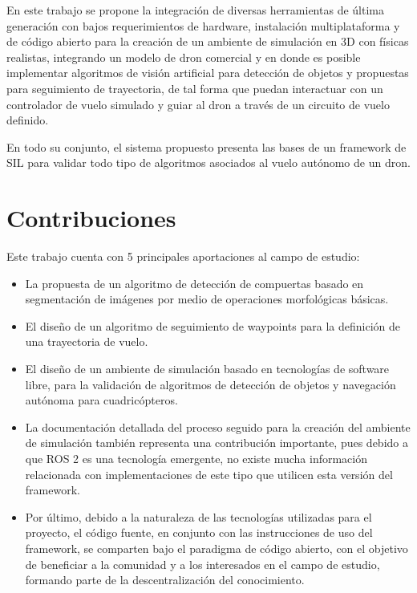 En este trabajo se propone la integración de diversas herramientas de última generación con bajos requerimientos de hardware, instalación multiplataforma y de código abierto para la creación de un ambiente de simulación en 3D con físicas realistas, integrando un modelo de dron comercial y en donde es posible implementar algoritmos de visión artificial para detección de objetos y propuestas para seguimiento de trayectoria, de tal forma que puedan interactuar con un controlador de vuelo simulado y guiar al dron a través de un circuito de vuelo definido.    

En todo su conjunto, el sistema propuesto presenta las bases de un framework de SIL para validar todo tipo de algoritmos asociados al vuelo autónomo de un dron.

\section{Contribuciones}

Este trabajo cuenta con 5 principales aportaciones al campo de estudio:

\begin{itemize}
    \item La propuesta de un algoritmo de detección de compuertas basado en segmentación de imágenes por medio de operaciones morfológicas básicas.
    \item El diseño de un algoritmo de seguimiento de waypoints para la definición de una trayectoria de vuelo.
    \item El diseño de un ambiente de simulación basado en tecnologías de software libre, para la validación de algoritmos de detección de objetos y navegación autónoma para cuadricópteros.
    \item La documentación detallada del proceso seguido para la creación del ambiente de simulación también representa una contribución importante, pues debido a que ROS 2 es una tecnología emergente, no existe mucha información relacionada con implementaciones de este tipo que utilicen esta versión del framework.
    \item Por último, debido a la naturaleza de las tecnologías utilizadas para el proyecto, el código fuente, en conjunto con las instrucciones de uso del framework, se comparten bajo el paradigma de código abierto, con el objetivo de beneficiar a la comunidad y a los interesados en el campo de estudio, formando parte de la descentralización del conocimiento.
\end{itemize}


